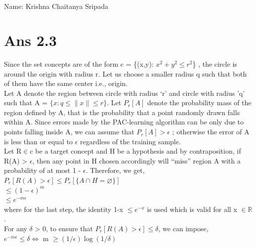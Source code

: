 \documentclass[10pt]{article}
\begin{document}
\section*{}
\begin{flushleft}
Name: Krishna Chaitanya Sripada\\
\end{flushleft}
\section*{Ans 2.3}
\begin{flushleft}
Since the set concepts are of the form c = \{(x,y): $x^{2} + y^{2} \leq r^{2}$\} , the circle is around the origin with radius r. Let us choose a smaller radius q such that both of them have the same center i.e., origin.\\
\vspace{0.5em}
Let A denote the region between circle with radius `r' and circle with radius 'q' such that A = $\{ x: q \leq \|x\| \leq r \}$. Let $P_{r}[A]$ denote the probability mass of the region defined by A, that is the probability that a point randomly drawn falls within A. Since errors made by the PAC-learning algorithm can be only due to points falling inside A, we can assume that $P_{r}[A] > \epsilon$ ; otherwise the error of A is less than or equal to $\epsilon$ regardless of the training sample.\\
\vspace{0.5em}
Let R$\in$c be a target concept and H be a hypothesis and by contraposition, if R(A) > $\epsilon$, then any point in H chosen accordingly will ``miss'' region A with a probability of at most 1 - $\epsilon$. Therefore, we get,\\
\vspace{0.5em}
$P_{r}[R(A) > \epsilon] \leq P_{r}[\{A \cap H = \varnothing \}]$\\
\hspace{1.8cm} $\leq {(1 - \epsilon)}^{m}$\\
\hspace{1.8cm} $\leq {e}^{-m\epsilon}$\\
where for the last step, the identity 1-x $\leq e^{-x}$ is used which is valid for all x $\in \mathbb{R}$.\\
\vspace{0.5em}
For any $\delta$ > 0, to ensure that $P_{r}[R(A) > \epsilon] \leq \delta$, we can impose,\\
\hspace{1.8cm} ${e}^{-m\epsilon} \leq \delta \Leftrightarrow$ m $\geq (1/\epsilon) \log (1/\delta)$
\end{flushleft}
\end{document}
